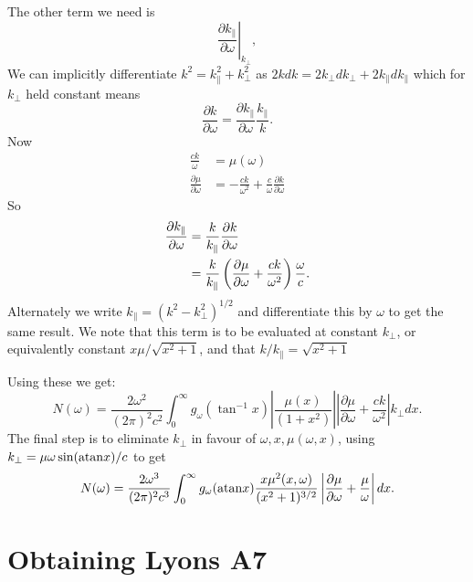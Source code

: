 \documentclass[]{article}
\begin{document}
\noindent The other term we need is 
\begin{equation}\label{kpar_omega} \left.\frac{\partial k_\parallel}{\partial \omega}\right|_{k_\perp}, 
\end{equation}
We can implicitly differentiate $k^2 = k_\parallel^2 + k_\perp^2$ as $ 2 k dk = 2 k_\perp dk_\perp + 2 k_\parallel dk_\parallel$ which for $k_\perp$ held constant means
\begin{equation}
\frac{\partial k}{\partial \omega} = \frac{\partial k_\parallel}{\partial \omega} \frac{k_\parallel}{k}.
\end{equation}Now
\begin{align}
\frac{c k}{\omega} &= \mu(\omega)\\
\frac{\partial \mu}{\partial \omega} &= -\frac{ c k }{\omega^2} + \frac{c}{\omega}\frac{\partial k}{\partial \omega}
\end{align}
So
\begin{align}
\frac{\partial k_\parallel}{\partial \omega}  &=  \frac{k}{k_\parallel} \frac{\partial k}{\partial \omega}\notag\\
&= \frac{k}{k_\parallel}\left( \frac{\partial \mu}{\partial \omega} + \frac {ck}{\omega^2}\right)\frac{\omega}{c}.
\end{align}
Alternately we write $k_\parallel = (k^2 - k_\perp^2)^{1/2}$ and differentiate this by $\omega$ to get the same result. We note that this term is to be evaluated at constant $k_\perp$, or equivalently constant $ x \mu / \sqrt{x^2 +1}$, and that $k/k_\parallel = \sqrt{x^2 +1}$

\noindent Using these we get:
\begin{equation}
N(\omega) = \frac{2  \omega^2}{(2\pi)^2 c^2} \int_0^\infty g_\omega( \tan^{-1} x )
\left| \frac{\mu(x)}{(1+x^2)} \right|
\left| \frac{\partial \mu}{\partial \omega} + \frac {ck}{\omega^2}\right|
 k_\perp d x .
\end{equation}
The final step is to eliminate $k_\perp$ in favour of $\omega, x, \mu(\omega, x)$, using $ k_\perp = \mu \omega \sin(\mathrm{atan} x)/c$ to get 
\begin{equation}\label{N_om}
N(\omega) = \frac{2  \omega^3}{(2\pi)^2 c^3} \int_0^\infty g_\omega( \mathrm{atan} x ) 
\frac{x \mu^2(x, \omega)}{(x^2 + 1)^{3/2}}
 \left| \frac{\partial \mu}{\partial \omega} + \frac {\mu}{\omega}\right|
 d x .
\end{equation}

\section{Obtaining Lyons A7}
\end{document}
